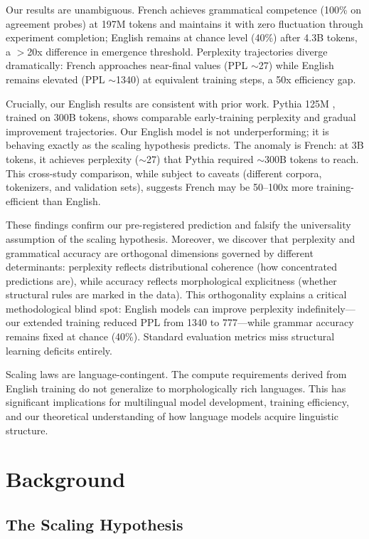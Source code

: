 \documentclass[11pt,a4paper]{article}
\begin{document}
Our results are unambiguous. French achieves grammatical competence (100\% on agreement probes) at 197M tokens and maintains it with zero fluctuation through experiment completion; English remains at chance level (40\%) after 4.3B tokens, a $>$20x difference in emergence threshold. Perplexity trajectories diverge dramatically: French approaches near-final values (PPL $\sim$27) while English remains elevated (PPL $\sim$1340) at equivalent training steps, a 50x efficiency gap.

Crucially, our English results are consistent with prior work. Pythia 125M \citep{biderman2023pythia}, trained on 300B tokens, shows comparable early-training perplexity and gradual improvement trajectories. Our English model is not underperforming; it is behaving exactly as the scaling hypothesis predicts. The anomaly is French: at 3B tokens, it achieves perplexity ($\sim$27) that Pythia required $\sim$300B tokens to reach. This cross-study comparison, while subject to caveats (different corpora, tokenizers, and validation sets), suggests French may be 50--100x more training-efficient than English.

These findings confirm our pre-registered prediction and falsify the universality assumption of the scaling hypothesis. Moreover, we discover that perplexity and grammatical accuracy are orthogonal dimensions governed by different determinants: perplexity reflects distributional coherence (how concentrated predictions are), while accuracy reflects morphological explicitness (whether structural rules are marked in the data). This orthogonality explains a critical methodological blind spot: English models can improve perplexity indefinitely---our extended training reduced PPL from 1340 to 777---while grammar accuracy remains fixed at chance (40\%). Standard evaluation metrics miss structural learning deficits entirely.

Scaling laws are language-contingent. The compute requirements derived from English training do not generalize to morphologically rich languages. This has significant implications for multilingual model development, training efficiency, and our theoretical understanding of how language models acquire linguistic structure.

\section{Background}

\subsection{The Scaling Hypothesis}
\end{document}
